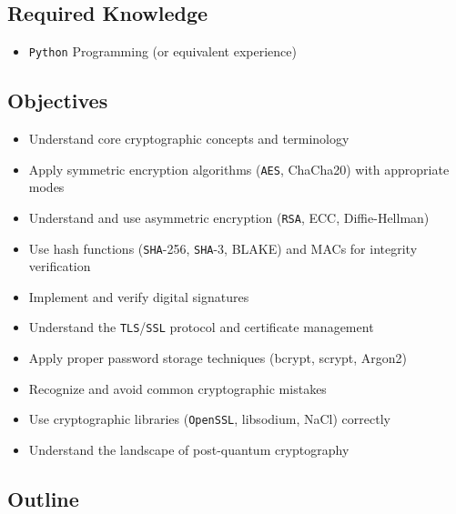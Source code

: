 \documentclass[
]{article}
\providecommand{\tightlist}{%
  \setlength{\itemsep}{0pt}\setlength{\parskip}{0pt}}
\begin{document}
\subsection{Required Knowledge}\label{required-knowledge}

\begin{itemize}
\tightlist
\item
  \texttt{Python} Programming (or equivalent experience)
\end{itemize}

\subsection{Objectives}\label{objectives}

\begin{itemize}
\tightlist
\item
  Understand core cryptographic concepts and terminology
\item
  Apply symmetric encryption algorithms (\texttt{AES}, ChaCha20) with
  appropriate modes
\item
  Understand and use asymmetric encryption (\texttt{RSA}, ECC,
  Diffie-Hellman)
\item
  Use hash functions (\texttt{SHA}-256, \texttt{SHA}-3, BLAKE) and MACs
  for integrity verification
\item
  Implement and verify digital signatures
\item
  Understand the \texttt{TLS}/\texttt{SSL} protocol and certificate
  management
\item
  Apply proper password storage techniques (bcrypt, scrypt, Argon2)
\item
  Recognize and avoid common cryptographic mistakes
\item
  Use cryptographic libraries (\texttt{OpenSSL}, libsodium, NaCl)
  correctly
\item
  Understand the landscape of post-quantum cryptography
\end{itemize}

\subsection{Outline}\label{outline}
\end{document}
